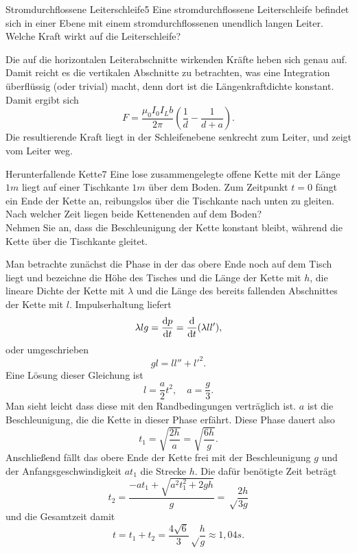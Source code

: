 \begin{problem}{Stromdurchflossene Leiterschleife}{5}
Eine stromdurchflossene Leiterschleife befindet sich in einer Ebene mit einem stromdurchflossenen
unendlich langen Leiter. Welche Kraft wirkt auf die Leiterschleife?
\begin{solution}
Die auf die horizontalen Leiterabschnitte wirkenden Kräfte heben sich genau auf. Damit reicht es die vertikalen Abschnitte zu betrachten, was eine Integration überflüssig (oder trivial) macht, denn dort ist die Längenkraftdichte konstant. Damit ergibt sich
\[
F=\frac{\mu_0 I_0 I_L b}{2\pi} \left( \frac{1}{d}-\frac{1}{d+a} \right).
\]
Die resultierende Kraft liegt in der Schleifenebene senkrecht zum Leiter, und zeigt vom Leiter weg.
\end{solution}
\end{problem}


\begin{problem}{Herunterfallende Kette}{7}
Eine lose zusammengelegte offene Kette mit der Länge $1\unit{m}$ liegt auf einer Tischkante $1\unit{m}$ über dem Boden. Zum Zeitpunkt $t = 0$ fängt ein Ende der Kette an, reibungslos über die Tischkante nach unten zu gleiten.\\
Nach welcher Zeit liegen beide Kettenenden auf dem Boden?\\
Nehmen Sie an, dass die Beschleunigung der Kette konstant bleibt, während die Kette über die Tischkante gleitet.
\begin{solution}
Man betrachte zunächst die Phase in der das obere Ende noch auf dem Tisch liegt und bezeichne die Höhe des Tisches und die Länge der Kette mit $h$, die lineare Dichte der Kette mit $\lambda$ und die Länge des bereits fallenden Abschnittes der Kette mit $l$. Impulserhaltung liefert
\[
\lambda l g = \frac{\mathrm{d} p}{\mathrm{d} t}  = \frac{\mathrm{d}}{\mathrm{d} t} (\lambda l l'),
\]
oder umgeschrieben
\[
g l = l l'' + l'^2.
\]
Eine Lösung dieser Gleichung ist
\[
l = \frac a2 t^2, \quad a = \frac g3.
\]
Man sieht leicht dass diese mit den Randbedingungen verträglich ist. $a$ ist die Beschleunigung, die die Kette in dieser Phase erfährt. Diese Phase dauert also
\[
t_1 = \sqrt{\frac{2 h}{a}} = \sqrt{\frac{6 h}{g}}.
\]
Anschließend fällt das obere Ende der Kette frei mit der Beschleunigung $g$ und der Anfangsgeschwindigkeit $a t_1$ die Strecke $h$. Die dafür benötigte Zeit beträgt
\[
t_2 = \frac{-at_1 + \sqrt{a^2 t_1^2 + 2 g h}}{g} = \sqrt\frac{2 h}{3 g}
\]
und die Gesamtzeit damit
\[
t = t_1 + t_2 = \frac{4 \sqrt 6}{3} \sqrt\frac{h}{g} \approx 1,04\unit{s}.
\]
\end{solution}
\end{problem}

